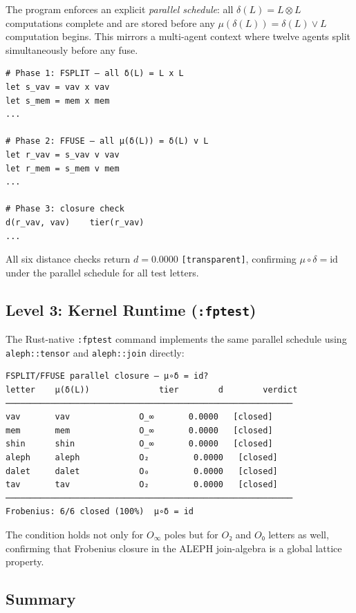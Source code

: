 \documentclass[12pt,a4paper]{article}
\newcommand{\OTwo}{O₂}
\newcommand{\OZero}{O₀}
\newcommand{\Frobcond}{\mu \circ \delta = \mathrm{id}}
\begin{document}
The program enforces an explicit \emph{parallel schedule}: all $\delta(L) = L \otimes L$ computations complete and are stored before any $\mu(\delta(L)) = \delta(L) \vee L$ computation begins. This mirrors a multi-agent context where twelve agents split simultaneously before any fuse.

\begin{lstlisting}
# Phase 1: FSPLIT — all δ(L) = L x L
let s_vav = vav x vav
let s_mem = mem x mem
...

# Phase 2: FFUSE — all μ(δ(L)) = δ(L) v L
let r_vav = s_vav v vav
let r_mem = s_mem v mem
...

# Phase 3: closure check
d(r_vav, vav)    tier(r_vav)
...
\end{lstlisting}

All six distance checks return $d = 0.0000$ \texttt{[transparent]}, confirming $\Frobcond$ under the parallel schedule for all test letters.

\subsection{Level 3: Kernel Runtime (\texttt{:fptest})}

The Rust-native \texttt{:fptest} command implements the same parallel schedule using \texttt{aleph::tensor} and \texttt{aleph::join} directly:

\begin{lstlisting}
FSPLIT/FFUSE parallel closure — μ∘δ = id?
letter    μ(δ(L))              tier        d        verdict
──────────────────────────────────────────────────────────
vav       vav              O_∞       0.0000   [closed]
mem       mem              O_∞       0.0000   [closed]
shin      shin             O_∞       0.0000   [closed]
aleph     aleph            O₂         0.0000   [closed]
dalet     dalet            O₀         0.0000   [closed]
tav       tav              O₂         0.0000   [closed]
──────────────────────────────────────────────────────────
Frobenius: 6/6 closed (100%)  μ∘δ = id
\end{lstlisting}

The condition holds not only for $O_\infty$ poles but for $\OTwo$ and $\OZero$ letters as well, confirming that Frobenius closure in the ALEPH join-algebra is a global lattice property.

\subsection{Summary}
\end{document}
